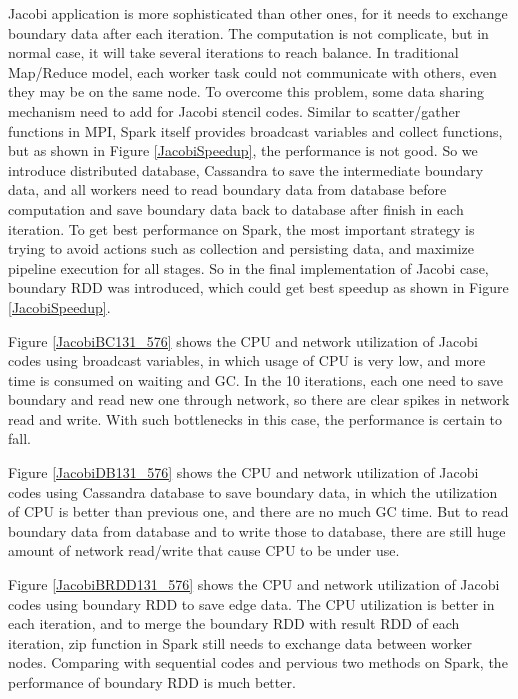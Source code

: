 Jacobi application is more sophisticated than other ones, for it needs to exchange boundary data after each iteration. The computation is not complicate, but in normal case, it will take several iterations to reach balance. In traditional Map/Reduce model, each worker task could not communicate with others, even they may be on the same node. To overcome this problem, some data sharing mechanism need to add for Jacobi stencil codes. Similar to scatter/gather functions in MPI, Spark itself provides broadcast variables and collect functions, but as shown in Figure \ref{JacobiSpeedup}, the performance is not good. So we introduce distributed database, Cassandra to save the intermediate boundary data, and all workers need to read boundary data from database before computation and save boundary data back to database after finish in each iteration. To get best performance on Spark, the most important strategy is trying to avoid actions such as collection and persisting data, and maximize pipeline execution for all stages. So in the final implementation of Jacobi case, boundary RDD was introduced, which could get best speedup as shown in Figure \ref{JacobiSpeedup}.

Figure \ref{JacobiBC131_576} shows the CPU and network utilization of Jacobi codes using broadcast variables, in which usage of CPU is very low, and more time is consumed on waiting and GC. In the 10 iterations, each one need to save boundary and read new one through network, so there are clear spikes in network read and write. With such bottlenecks in this case, the performance is certain to fall. 

Figure \ref{JacobiDB131_576} shows the CPU and network utilization of Jacobi codes using Cassandra database to save boundary data, in which the utilization of CPU is better than previous one, and there are no much GC time. But to read boundary data from database and to write those to database, there are still huge amount of network read/write that cause CPU to be under use.

Figure \ref{JacobiBRDD131_576} shows the CPU and network utilization of Jacobi codes using boundary RDD to save edge data. The CPU utilization is better in each iteration, and to merge the boundary RDD with result RDD of each iteration, zip function in Spark still needs to exchange data between worker nodes. Comparing with sequential codes and pervious two methods on Spark, the performance of boundary RDD is much better. 


